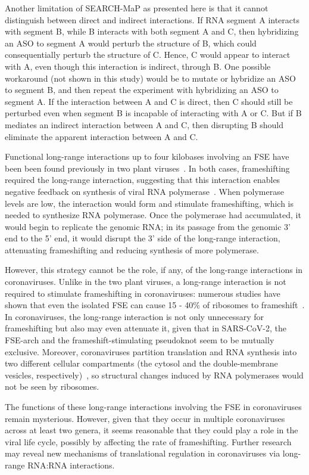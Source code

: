 \documentclass[main.tex]{subfiles}
\begin{document}
Another limitation of SEARCH-MaP as presented here is that it cannot distinguish between direct and indirect interactions. If RNA segment A interacts with segment B, while B interacts with both segment A and C, then hybridizing an ASO to segment A would perturb the structure of B, which could consequentially perturb the structure of C. Hence, C would appear to interact with A, even though this interaction is indirect, through B. One possible workaround (not shown in this study) would be to mutate or hybridize an ASO to segment B, and then repeat the experiment with hybridizing an ASO to segment A. If the interaction between A and C is direct, then C should still be perturbed even when segment B is incapable of interacting with A or C. But if B mediates an indirect interaction between A and C, then disrupting B should eliminate the apparent interaction between A and C.

Functional long-range interactions up to four kilobases involving an FSE have been been found previously in two plant viruses~\cite{Barry2002,Tajima2011}. In both cases, frameshifting required the long-range interaction, suggesting that this interaction enables negative feedback on synthesis of viral RNA polymerase~\cite{Barry2002}. When polymerase levels are low, the interaction would form and stimulate frameshifting, which is needed to synthesize RNA polymerase. Once the polymerase had accumulated, it would begin to replicate the genomic RNA; in its passage from the genomic 3' end to the 5' end, it would disrupt the 3' side of the long-range interaction, attenuating frameshifting and reducing synthesis of more polymerase.

However, this strategy cannot be the role, if any, of the long-range interactions in coronaviruses. Unlike in the two plant viruses, a long-range interaction is not required to stimulate frameshifting in coronaviruses: numerous studies have shown that even the isolated FSE can cause 15 - 40\% of ribosomes to frameshift~\cite{Bhatt2021,Haniff2020,Kelly2020,Lan2022,Plant2010,YSun2021,KZhang2021}. In coronaviruses, the long-range interaction is not only unnecessary for frameshifting but also may even attenuate it, given that in SARS-CoV-2, the FSE-arch and the frameshift-stimulating pseudoknot seem to be mutually exclusive. Moreover, coronaviruses partition translation and RNA synthesis into two different cellular compartments (the cytosol and the double-membrane vesicles, respectively)~\cite{Wolff2020}, so structural changes induced by RNA polymerases would not be seen by ribosomes.

The functions of these long-range interactions involving the FSE in coronaviruses remain mysterious. However, given that they occur in multiple coronaviruses across at least two genera, it seems reasonable that they could play a role in the viral life cycle, possibly by affecting the rate of frameshifting. Further research may reveal new mechanisms of translational regulation in coronaviruses via long-range RNA:RNA interactions.
\end{document}
